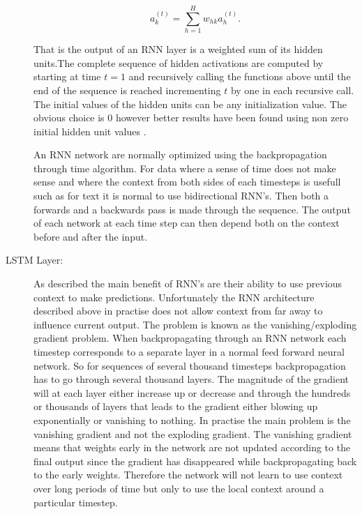 \begin{description}
        \begin{equation}
            a^{(t)}_k = \sum_{h=1}^H w_{hk} a_{h}^{(t)}.
        \end{equation}

        That is the output of an \gls{RNN} layer is a weighted sum of its
        hidden units.The complete sequence of hidden activations are computed
        by starting at time $t=1$ and recursively calling the functions above
        until the end of the sequence is reached incrementing $t$ by one in
        each recursive call. The initial values of the hidden units can be
        any initialization value. The obvious choice is 0 however better
        results have been found using non zero initial hidden unit values
        \cite{DBLP:series/sci/2012-385}.

        An \gls{RNN} network are normally optimized using the backpropagation
        through time algorithm. For data where a sense of time does not make
        sense and where the context from both sides of each timesteps is usefull
        such as for text it is normal to use bidirectional \gls{RNN}'s. Then
        both a forwards and a backwards pass is made through the sequence. The
        output of each network at each time step can then depend both on the
        context before and after the input.

    \item[\gls{LSTM} Layer:]

        As described the main benefit of \gls{RNN}'s are their ability to use
        previous context to make predictions. Unfortunately the \gls{RNN}
        architecture described above in practise does not allow context from
        far away to influence current output. The problem is known as the
        vanishing/exploding gradient problem. When backpropagating through an
        \gls{RNN} network each timestep corresponds to a separate layer in a
        normal feed forward neural network. So for sequences of several thousand
        timesteps backpropagation has to go through several thousand layers.
        The magnitude of the gradient will at each layer either increase up or
        decrease and through the hundreds or thousands of layers that leads to
        the gradient either blowing up exponentially or vanishing to nothing.
        In practise the main problem is the vanishing gradient and not the
        exploding gradient. The vanishing gradient means that weights early
        in the network are not updated according to the final output since
        the gradient has disappeared while backpropagating back to the early
        weights. Therefore the network will not learn to use context over long
        periods of time but only to use the local context around a particular
        timestep.


\end{description}
